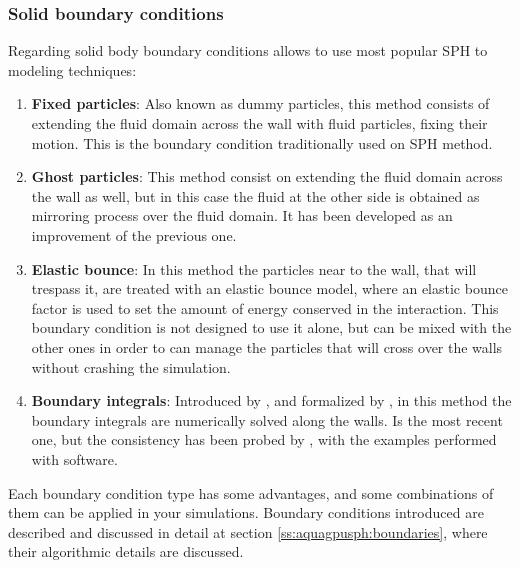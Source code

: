 \subsubsection{Solid boundary conditions}
\label{ss:sph:discrete:BC}
%
Regarding solid body boundary conditions \NAME allows to use most popular SPH to modeling techniques:
%
\begin{enumerate}
	\item \textbf{Fixed particles}: Also known as dummy particles, this method consists
	of extending the fluid domain across the wall with fluid particles, fixing their motion.
	This is the boundary condition traditionally used on SPH method.
	\item \textbf{Ghost particles}: This method consist on extending the fluid domain across
	the wall as well, but in this case the fluid at the other side is obtained as mirroring
	process over the fluid domain. It has been developed as an improvement of the previous one.
	\item \textbf{Elastic bounce}: In this method the particles near to the wall, that will
	trespass it, are treated with an elastic bounce model, where an elastic bounce factor is
	used to set the amount of energy conserved in the interaction. This boundary condition
	is not designed to use it alone, but can be mixed with the other ones in order to can
	manage the particles that will cross over the walls without crashing the simulation.
	\item \textbf{Boundary integrals}: Introduced by \citet{deleffe_etal_spheric09},
	and formalized by \citet{ferrand_etal_2012}, in this method the boundary integrals
	are numerically solved along the walls. Is the most recent one, but the consistency
	has been probed by \citet{Maciaetal_PTP_2012}, with the examples performed with \NAME
	software.
\end{enumerate}
%
Each boundary condition type has some advantages, and some combinations of them can be applied in
your simulations. Boundary conditions introduced are described and discussed in detail at section
\ref{ss:aquagpusph:boundaries}, where their algorithmic details are discussed.
%
